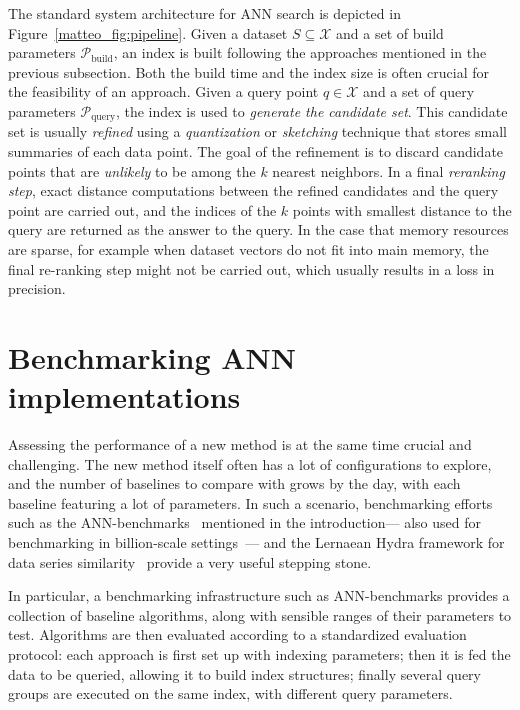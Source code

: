 \documentclass[11pt]{article}
\begin{document}
The standard system architecture for ANN search is depicted in
Figure~\ref{matteo_fig:pipeline}.
Given a dataset $S \subseteq \mathcal{X}$ and a set of build parameters $\mathcal{P}_\text{build}$, an index is built following the approaches mentioned in the previous subsection.
Both the build time and the index size is often crucial for the feasibility of an approach.
Given a query point $q \in \mathcal{X}$ and a set of query parameters $\mathcal{P}_{\text{query}}$, the index is used to \emph{generate the candidate set}.
This candidate set is usually \emph{refined} using a \emph{quantization} or \emph{sketching} technique that stores small summaries of each data point.
The goal of the refinement is to discard candidate points that are \emph{unlikely} to be among the $k$ nearest neighbors.
In a final \emph{reranking step}, exact distance computations between the refined candidates and the query point are carried out, and the indices of the $k$ points with smallest distance to the query are returned as the answer to the query.
In the case that memory resources are sparse, for example when dataset vectors do not fit into main memory, the final re-ranking step might not be carried out, which usually results in a loss in precision.


\section{Benchmarking ANN implementations}
\label{matteo_sec:benchmarking}

Assessing the performance of a new method is at the same time crucial and
challenging. The new method itself often has a lot of configurations to
explore, and the number of baselines to compare with grows by the day, with
each baseline featuring a lot of parameters. In such a scenario, benchmarking
efforts such as the ANN-benchmarks~\cite{DBLP:journals/is/AumullerBF20} mentioned in the introduction---
also used for benchmarking in billion-scale settings~\cite{DBLP:conf/nips/SimhadriWADBBCH21}---
and the Lernaean Hydra framework for data series similarity~\cite{DBLP:journals/pvldb/EchihabiZPB19}
provide a very useful stepping stone.

In particular, a benchmarking infrastructure such as ANN-benchmarks provides a
collection of baseline algorithms, along with sensible ranges of their
parameters to test. Algorithms are then evaluated according to a standardized
evaluation protocol: each approach is first set up with indexing parameters;
then it is fed the data to be queried, allowing it to build index structures;
finally several query groups are executed on the same index, with different
query parameters.
\end{document}

